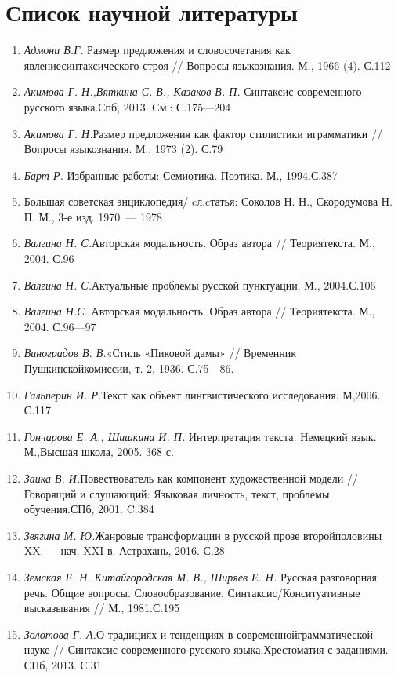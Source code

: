     \chapter{Список научной литературы}
      \begin{enumerate}
        \item \textit{Адмони В.Г.} Размер предложения и словосочетания как явлениесинтаксического строя // Вопросы языкознания. М., 1966 (4). С.112
        \item \textit{Акимова Г. Н.,Вяткина С. В., Казаков В. П. }Синтаксис современного русского языка.Спб, 2013. См.: С.175—204
        \item \textit{Акимова Г. Н.}Размер предложения как фактор стилистики играмматики // Вопросы языкознания. М., 1973 (2). С.79
        \item \textit{Барт Р.} Избранные работы: Семиотика. Поэтика. М., 1994.С.387
        \item Большая советская энциклопедия/ cл.cтатья: Соколов Н. Н., Скородумова Н. П. М., 3-е изд. 1970~--- 1978
        \item \textit{Валгина Н. С.}Авторская модальность. Образ автора // Теориятекста. М., 2004. С.96
        \item \textit{Валгина Н. С.}Актуальные проблемы русской пунктуации. М., 2004.С.106
        \item \textit{Валгина Н.С. }Авторская модальность. Образ автора // Теориятекста. М., 2004. С.96—97
        \item \textit{Виноградов В. В.}«Стиль «Пиковой дамы» // Временник Пушкинскойкомиссии, т. 2, 1936. С.75—86.
        \item \textit{Гальперин И. Р.}Текст как объект лингвистического исследования. М,2006. С.117
        \item \textit{Гончарова Е. А., Шишкина И. П. }Интерпретация текста. Немецкий язык. М.,Высшая школа, 2005. 368 с. 
        \item \textit{Заика В. И.}Повествователь как компонент художественной модели // Говорящий и слушающий: Языковая личность, текст, проблемы обучения.СПб, 2001. C.384
        \item \textit{Звягина М. Ю.}Жанровые трансформации в русской прозе второйполовины XX~--- нач. XXI в. Астрахань, 2016. С.28
        \item \textit{Земская Е. Н. Китайгородская М. В., Ширяев Е. Н. }Русская разговорная речь. Общие вопросы. Словообразование. Синтаксис/Конситуативные высказывания // М., 1981.С.195
        \item \textit{Золотова Г. А.}О традициях и тенденциях в современнойграмматической науке // Синтаксис современного русского языка.Хрестоматия с заданиями. СПб, 2013. С.31

\end{enumerate}
